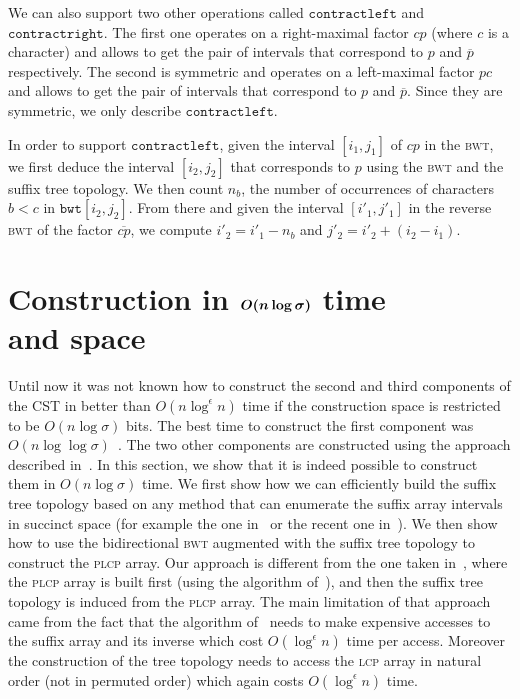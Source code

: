 \documentclass[a4paper]{article}
\begin{document}
We can also support two other operations called $\mathtt{contractleft}$ and $\mathtt{contractright}$. The first one operates on a right-maximal factor $cp$ (where $c$ is a character) and allows to get the pair of intervals that correspond to $p$ and $\overline{p}$ respectively. The second is symmetric and operates on a left-maximal factor $pc$ and allows to get the pair of intervals that correspond to $p$ and $\overline{p}$. Since they are symmetric, we only describe $\mathtt{contractleft}$. 

In order to support $\mathtt{contractleft}$, given the interval $[i_1,j_1]$ of $cp$ in the \textsc{bwt}, we first deduce the interval $[i_2,j_2]$
that corresponds to $p$ using the \textsc{bwt} and the suffix tree topology. We then count $n_b$, the number of occurrences of characters $b<c$ in $\mathtt{bwt}[i_2,j_2]$. From there and given the interval $[i'_1,j'_1]$ in the reverse \textsc{bwt} of the factor $\overline{cp}$, we compute $i'_2=i'_1-n_b$ and $j'_2=i'_2+(i_2-i_1)$. 









\section{Construction in {\large $\boldsymbol{O(\lowercase{n}\log\sigma)}$} time \\and space}
\label{sec:small_alpha_build}

Until now it was not known how to construct the second and third components of the \textsc{CST} in better than $O(n\log^\epsilon n)$ time if the construction space is restricted to be $O(n\log\sigma)$ bits. The best time to construct the first component was $O(n\log\log\sigma)$~\cite{HSS09}. The two other components are constructed using the approach described in~\cite{HS02}. 
In this section, we show that it is indeed possible to construct them in $O(n\log\sigma)$ time. We first show how we can efficiently build the suffix tree topology based on any method that can enumerate the suffix array intervals in succinct space (for example the one in~\cite{BBO12,BGOS13} or the recent one in~\cite{BCKM13}). 
We then show how to use the bidirectional \textsc{bwt} augmented with the suffix tree topology to construct the \textsc{plcp} array. Our approach is different from the one taken in~\cite{HS02}, where the \textsc{plcp} array is built first (using the algorithm of~\cite{KLAAP01}), and then the suffix tree topology is induced from the \textsc{plcp} array. The main limitation of that approach came from the fact that the algorithm of~\cite{KLAAP01} needs to make expensive accesses to the suffix array and its inverse which cost $O(\log^\epsilon n)$ time per access. Moreover the construction of the tree topology needs to access the \textsc{lcp} array in natural order (not in permuted order) which again costs $O(\log^\epsilon n)$ time. 
\end{document}
